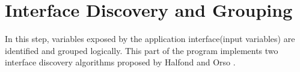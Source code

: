 \section{Interface Discovery and Grouping}

In this step, variables exposed by the application interface(input variables) are identified and grouped logically. This part of the program implements two interface discovery algorithms proposed by Halfond and Orso \cite{ref3}.


